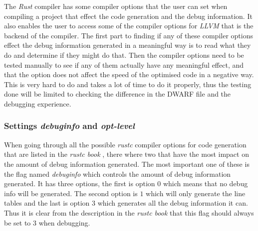 

The \emph{Rust} compiler has some compiler options that the user can set when compiling a project that effect the code generation and the debug information.
It also enables the user to access some of the compiler options for \emph{LLVM} that is the backend of the compiler.
The first part to finding if any of these compiler options effect the debug information generated in a meaningful way is to read what they do and determine if they might do that.
Then the compiler options need to be tested manually to see if any of them actually have any meaningful effect, and that the option does not affect the speed of the optimised code in a negative way.
This is very hard to do and takes a lot of time to do it properly, thus the testing done will be limited to checking the difference in the \gls{DWARF} file and the debugging experience.


\subsubsection{Settings \emph{debuginfo} and \emph{opt-level}}
When going through all the possible \emph{rustc} compiler options for code generation that are listed in the \emph{rustc book} \cite{rustc-book-codegen}, there where two that have the most impact on the amount of debug information generated.
The most important one of these is the flag named \emph{debuginfo} which controls the amount of debug information generated.
It has three options, the first is option $0$ which means that no debug info will be generated.
The second option is $1$ which will only generate the line tables and the last is option $3$ which generates all the debug information it can.
Thus it is clear from the description in the \emph{rustc book} that this flag should always be set to $3$ when debugging.


